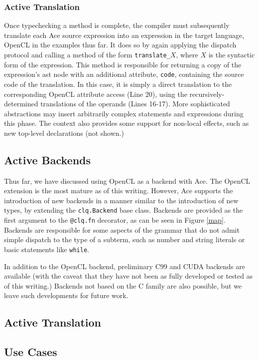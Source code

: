\documentclass{sig-alternate}
\begin{document}
\subsubsection{Active Translation}
Once typechecking a method is complete, the compiler must subsequently translate each Ace source expression into an expression in the target language, OpenCL in the examples thus far. It does so by again applying the dispatch protocol and calling a method of the form \verb|translate_|$X$, where $X$ is the syntactic form of the expression. This method is responsible for returning a copy of the expression's ast node with an additional attribute, \verb|code|, containing the source code of the translation. In this case, it is simply a direct translation to the corresponding OpenCL attribute access (Line 20), using the recursively-determined translations of the operands (Lines 16-17).  More sophisticated abstractions may insert arbitrarily complex statements and expressions during this phase. The context also provides some support for non-local effects, such as new top-level declarations (not shown.)

\subsection{Active Backends}\label{backends}
Thus far, we have discussed using OpenCL as a backend with Ace. The OpenCL extension is the most mature as of this writing. However, Ace supports the introduction of new backends in a manner similar to the introduction of new types, by extending the \verb|clq.Backend| base class. Backends are provided as the first argument to the \verb|@clq.fn| decorator, as can be seen in Figure \ref{map}. 
Backends are responsible for some aspects of the grammar that do not admit simple dispatch to the type of a subterm, such as number and string literals or basic statements like \verb|while|.

In addition to the OpenCL backend, preliminary C99 and CUDA backends are available (with the caveat that they have not been as fully developed or tested as of this writing.) Backends not based on the C family are also possible, but we leave such developments for future work.


\subsection{Active Translation}\label{translation}
\subsection{Use Cases}\label{usecases}
\end{document}
